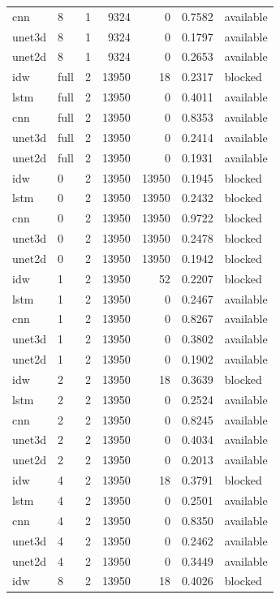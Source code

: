 \begin{tabular}{llrrrrl}
cnn & 8 & 1 & 9324 & 0 & 0.7582 & available \\
unet3d & 8 & 1 & 9324 & 0 & 0.1797 & available \\
unet2d & 8 & 1 & 9324 & 0 & 0.2653 & available \\
idw & full & 2 & 13950 & 18 & 0.2317 & blocked \\
lstm & full & 2 & 13950 & 0 & 0.4011 & available \\
cnn & full & 2 & 13950 & 0 & 0.8353 & available \\
unet3d & full & 2 & 13950 & 0 & 0.2414 & available \\
unet2d & full & 2 & 13950 & 0 & 0.1931 & available \\
idw & 0 & 2 & 13950 & 13950 & 0.1945 & blocked \\
lstm & 0 & 2 & 13950 & 13950 & 0.2432 & blocked \\
cnn & 0 & 2 & 13950 & 13950 & 0.9722 & blocked \\
unet3d & 0 & 2 & 13950 & 13950 & 0.2478 & blocked \\
unet2d & 0 & 2 & 13950 & 13950 & 0.1942 & blocked \\
idw & 1 & 2 & 13950 & 52 & 0.2207 & blocked \\
lstm & 1 & 2 & 13950 & 0 & 0.2467 & available \\
cnn & 1 & 2 & 13950 & 0 & 0.8267 & available \\
unet3d & 1 & 2 & 13950 & 0 & 0.3802 & available \\
unet2d & 1 & 2 & 13950 & 0 & 0.1902 & available \\
idw & 2 & 2 & 13950 & 18 & 0.3639 & blocked \\
lstm & 2 & 2 & 13950 & 0 & 0.2524 & available \\
cnn & 2 & 2 & 13950 & 0 & 0.8245 & available \\
unet3d & 2 & 2 & 13950 & 0 & 0.4034 & available \\
unet2d & 2 & 2 & 13950 & 0 & 0.2013 & available \\
idw & 4 & 2 & 13950 & 18 & 0.3791 & blocked \\
lstm & 4 & 2 & 13950 & 0 & 0.2501 & available \\
cnn & 4 & 2 & 13950 & 0 & 0.8350 & available \\
unet3d & 4 & 2 & 13950 & 0 & 0.2462 & available \\
unet2d & 4 & 2 & 13950 & 0 & 0.3449 & available \\
idw & 8 & 2 & 13950 & 18 & 0.4026 & blocked \\

\end{tabular}
